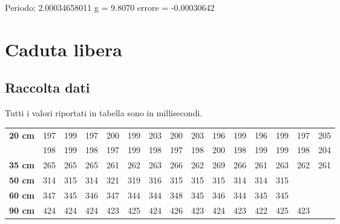 Periodo: 2.00034658011
g = 9.8070 errore = -0.00030642
\section{Caduta libera}

\subsection{Raccolta dati}
Tutti i valori riportati in tabella sono in millisecondi.
\begin{center}
\begin{tabular}{r|*{14}{c}}
\textbf{20 cm} & 197 & 199 & 197 & 200 & 199 & 203 & 200 & 203 & 196 & 199 & 196 & 199 & 197 & 205\\
& 198 & 199 & 198 & 197 & 199 & 198 & 197 & 198 & 200 & 198 & 199 & 199 & 198 & 204\\
\midrule
\textbf{35 cm} & 265 & 265 & 265 & 261 & 262 & 263 & 266 & 262 & 269 & 266 & 261 & 263 & 262 & 261\\
\midrule
\textbf{50 cm} & 314 & 315 & 314 & 321 & 319 & 316 & 315 & 315 & 315 & 314 & 314 & 315\\
\midrule
\textbf{60 cm} & 347 & 345 & 346 & 347 & 344 & 344 & 348 & 345 & 346 & 344 & 345 & 345\\
\midrule
\textbf{90 cm} & 424& 424& 424& 423& 425& 424& 426& 423& 424& 423& 422& 425& 423\\
\end{tabular}
\end{center}

